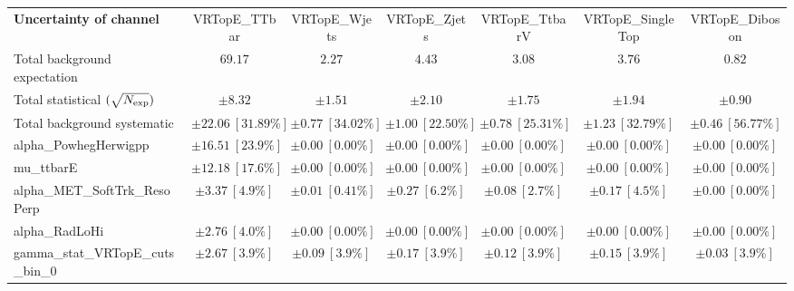 
\begin{sidewaystable}
\begin{center}
\setlength{\tabcolsep}{0.0pc}
\begin{tabular*}{\textwidth}{@{\extracolsep{\fill}}lcccccc}
\noalign{\smallskip}\hline\noalign{\smallskip}
{\bf Uncertainty of channel}                                    & VRTopE\_TTbar            & VRTopE\_Wjets            & VRTopE\_Zjets            & VRTopE\_TtbarV            & VRTopE\_SingleTop            & VRTopE\_Diboson            \\
\noalign{\smallskip}\hline\noalign{\smallskip}
Total background expectation             &  $69.17$        &  $2.27$        &  $4.43$        &  $3.08$        &  $3.76$        &  $0.82$       \\
\noalign{\smallskip}\hline\noalign{\smallskip}
Total statistical $(\sqrt{N_{\rm exp}})$              & $\pm 8.32$        & $\pm 1.51$        & $\pm 2.10$        & $\pm 1.75$        & $\pm 1.94$        & $\pm 0.90$       \\
Total background systematic               & $\pm 22.06\ [31.89\%] $        & $\pm 0.77\ [34.02\%] $        & $\pm 1.00\ [22.50\%] $        & $\pm 0.78\ [25.31\%] $        & $\pm 1.23\ [32.79\%] $        & $\pm 0.46\ [56.77\%] $             \\
\noalign{\smallskip}\hline\noalign{\smallskip}
\noalign{\smallskip}\hline\noalign{\smallskip}
alpha\_PowhegHerwigpp         & $\pm 16.51\ [23.9\%] $          & $\pm 0.00\ [0.00\%] $          & $\pm 0.00\ [0.00\%] $          & $\pm 0.00\ [0.00\%] $          & $\pm 0.00\ [0.00\%] $          & $\pm 0.00\ [0.00\%] $       \\
mu\_ttbarE         & $\pm 12.18\ [17.6\%] $          & $\pm 0.00\ [0.00\%] $          & $\pm 0.00\ [0.00\%] $          & $\pm 0.00\ [0.00\%] $          & $\pm 0.00\ [0.00\%] $          & $\pm 0.00\ [0.00\%] $       \\
alpha\_MET\_SoftTrk\_ResoPerp         & $\pm 3.37\ [4.9\%] $          & $\pm 0.01\ [0.41\%] $          & $\pm 0.27\ [6.2\%] $          & $\pm 0.08\ [2.7\%] $          & $\pm 0.17\ [4.5\%] $          & $\pm 0.00\ [0.00\%] $       \\
alpha\_RadLoHi         & $\pm 2.76\ [4.0\%] $          & $\pm 0.00\ [0.00\%] $          & $\pm 0.00\ [0.00\%] $          & $\pm 0.00\ [0.00\%] $          & $\pm 0.00\ [0.00\%] $          & $\pm 0.00\ [0.00\%] $       \\
gamma\_stat\_VRTopE\_cuts\_bin\_0         & $\pm 2.67\ [3.9\%] $          & $\pm 0.09\ [3.9\%] $          & $\pm 0.17\ [3.9\%] $          & $\pm 0.12\ [3.9\%] $          & $\pm 0.15\ [3.9\%] $          & $\pm 0.03\ [3.9\%] $       \\

\end{tabular*}
\end{center}
\end{sidewaystable}
